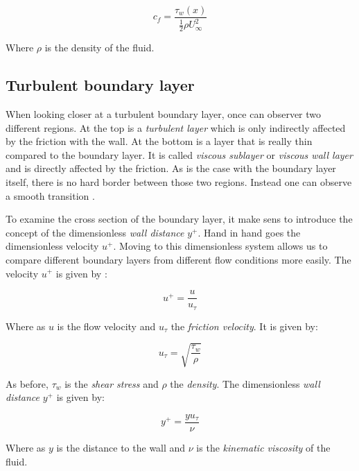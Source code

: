 \begin{equation}
  c_{f} = \frac{\tau_{w}(x)}{\frac{1}{2}\rho U_{\infty}^{2}}
\end{equation}

\noindent Where $\rho$ is the density of the fluid.


\subsection{Turbulent boundary layer}
\label{sec:turbulent_BL}
When looking closer at a turbulent boundary layer, once can observer two
different regions. At the top is a \textit{turbulent layer} which is only
indirectly affected by the friction with the wall. At the bottom is a layer that
is really thin compared to the boundary layer. It is called \textit{viscous
sublayer} or \textit{viscous wall layer} and is directly affected by the
friction. As is the case with the boundary layer itself, there is no hard border
between those two regions. Instead one can observe a smooth transition
\cite{Schlichting2018}.

To examine the cross section of the boundary layer, it make sens to introduce
the concept of the dimensionless \textit{wall distance} $y^{+}$. Hand in hand
goes the dimensionless velocity $u^{+}$. Moving to this dimensionless system
allows us to compare different boundary layers from different flow conditions
more easily. The velocity $u^{+}$ is given by \cite{Schlichting2018}:

\begin{equation}
  u^{+} = \frac{u}{u_{\tau}}
\end{equation}

\noindent Where as $u$ is the flow velocity and $u_{\tau}$ the \textit{friction velocity}.
It is given by:

\begin{equation}
  u_{\tau} = \sqrt{\frac{\tau_{w}}{\rho}}
\end{equation}

\noindent As before, $\tau_{w}$ is the \textit{shear stress} and $\rho$ the
\textit{density}. The dimensionless \textit{wall distance} $y^{+}$ is given by:

\begin{equation}
  y^{+} = \frac{yu_{\tau}}{\nu}
\end{equation}

\noindent Where as $y$ is the distance to the wall and $\nu$ is the \textit{kinematic
viscosity} of the fluid.


